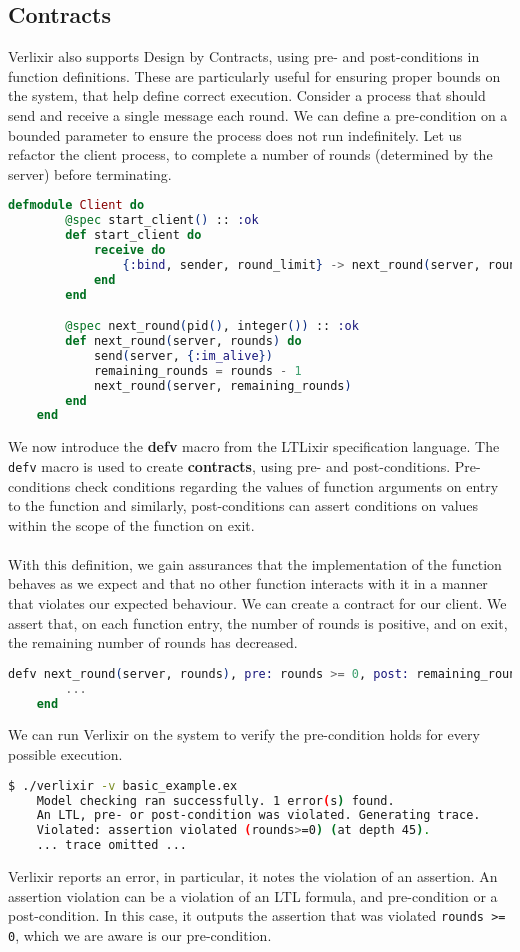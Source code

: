 \subsection{Contracts} 
Verlixir also supports Design by Contracts, using pre- and post-conditions in function definitions. These are particularly useful for ensuring proper bounds on the system, that help define correct execution. Consider a process that should send and receive a single message each round. We can define a pre-condition on a bounded parameter to ensure the process does not run indefinitely. Let us refactor the client process, to complete a number of rounds (determined by the server) before terminating.
\begin{lstlisting}[language=Elixir, xleftmargin=.3\linewidth]
    defmodule Client do
        @spec start_client() :: :ok
        def start_client do
            receive do
                {:bind, sender, round_limit} -> next_round(server, round_limit)
            end
        end

        @spec next_round(pid(), integer()) :: :ok
        def next_round(server, rounds) do
            send(server, {:im_alive})
            remaining_rounds = rounds - 1
            next_round(server, remaining_rounds)
        end
    end
\end{lstlisting}
We now introduce the \textbf{defv} macro from the LTLixir specification language. The \texttt{defv} macro is used to create \textbf{contracts}, using pre- and post-conditions. Pre-conditions check conditions regarding the values of function arguments on entry to the function and similarly, post-conditions can assert conditions on values within the scope of the function on exit. 
\\ \\
With this definition, we gain assurances that the implementation of the function behaves as we expect and that no other function interacts with it in a manner that violates our expected behaviour. We can create a contract for our client. We assert that, on each function entry, the number of rounds is positive, and on exit, the remaining number of rounds has decreased.
\begin{lstlisting}[language=Elixir, xleftmargin=.3\linewidth]
    defv next_round(server, rounds), pre: rounds >= 0, post: remaining_rounds < rounds do
        ...
    end
\end{lstlisting}
We can run Verlixir on the system to verify the pre-condition holds for every possible execution.
\begin{lstlisting}[language=bash, xleftmargin=.1\linewidth]
    $ ./verlixir -v basic_example.ex
    Model checking ran successfully. 1 error(s) found.
    An LTL, pre- or post-condition was violated. Generating trace.
    Violated: assertion violated (rounds>=0) (at depth 45).
    ... trace omitted ...
\end{lstlisting}
Verlixir reports an error, in particular, it notes the violation of an assertion. An assertion violation can be a violation of an LTL formula, and pre-condition or a post-condition. In this case, it outputs the assertion that was violated \texttt{rounds >= 0}, which we are aware is our pre-condition.
